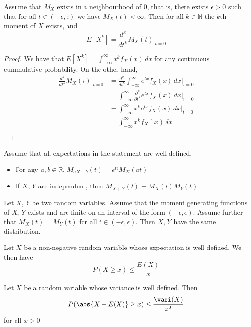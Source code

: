 \documentclass[a4paper]{article}
\begin{document}
\begin{thm}{}{} Assume that $M_X$ exists in a neighbourhood of $0$, that is, there exists $\epsilon>0$ such that for all $t\in(-\epsilon,\epsilon)$ we have $M_X(t)<\infty$. Then for all $k\in\mathbb{N}$ the $k$th moment of $X$ exists, and $$E[X^k]=\frac{d^k}{dt^k}M_X(t)\bigg|_{t=0}$$
\end{thm}
\begin{proof} We have that $E[X^k]=\int_{-\infty}^\infty x^kf_X(x)\,dx$ for any continuous cummulative probability. On the other hand, 
\begin{align*}
\frac{d^k}{dt^k}M_X(t)\bigg|_{t=0}&=\frac{d^k}{dt^k}\int_{-\infty}^\infty e^{tx}f_X(x)\,dx\bigg|_{t=0}\\
&=\int_{-\infty}^\infty\frac{\partial^k}{\partial t^k}e^{tx}f_X(x)\,dx\bigg|_{t=0}\\
&=\int_{-\infty}^\infty x^ke^{tx}f_X(x)\,dx\bigg|_{t=0}\\
&=\int_{-\infty}^\infty x^kf_X(x)\,dx\\
\end{align*}
\end{proof}

\begin{prp}{}{} Assume that all expectations in the statement are well defined. 
\begin{itemize}
\item For any $a,b\in\mathbb{R}$, $M_{aX+b}(t)=e^{tb}M_X(at)$
\item If $X$, $Y$ are independent, then $M_{X+Y}(t)=M_X(t)M_Y(t)$
\end{itemize}
\end{prp}

\begin{thm}{}{} Let $X$, $Y$ be two random variables. Assume that the moment generating functions of $X$, $Y$ exists and are finite on an interval of the form $(-\epsilon,\epsilon)$. Assume further that $M_X(t)=M_Y(t)$ for all $t\in(-\epsilon,\epsilon)$. Then $X$, $Y$ have the same distribution. 
\end{thm}

\begin{thm}{}{} Let $X$ be a non-negative random variable whose expectation is well defined. We then have $$P(X\geq x)\leq\frac{E(X)}{x}$$
\end{thm}

\begin{thm}{}{} Let $X$ be a random variable whose variance is well defined. Then $$P(\abs{X-E(X)}\geq x)\leq\frac{\vari(X)}{x^2}$$ for all $x>0$
\end{thm}
\end{document}
